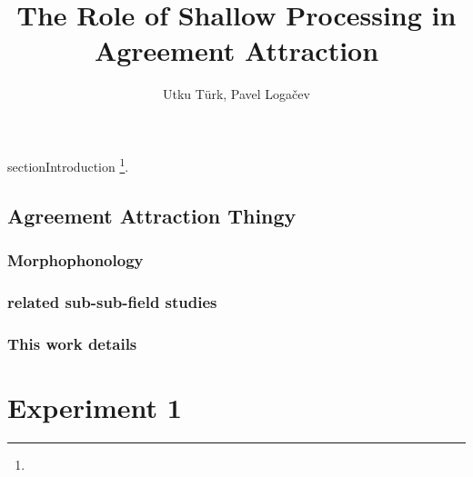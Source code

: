 \documentclass[doc,a4paper,man,natbib,floatsintext,noextraspace]{apa6}\usepackage[]{graphicx}\usepackage[]{color}
\title{The Role of Shallow Processing in Agreement Attraction}
\author{Utku Türk, Pavel Loga\v{c}ev}
\affiliation{Boğaziçi University}
\begin{document}
\maketitle


section{Introduction} \label{sec:Intro}
\footnote{\printglossaries}. %
\subsection{Agreement Attraction Thingy} \label{sec:Intro:literature}
\subsubsection{Morphophonology} \label{sec:Intro:literature:morphophonology}


\subsubsection{related sub-sub-field studies} \label{sec:Intro:literature:others}

\subsubsection{This work details} \label{sec:Intro:literature:thiswork}





\section{Experiment 1} \label{sec:exp1}
\end{document}
